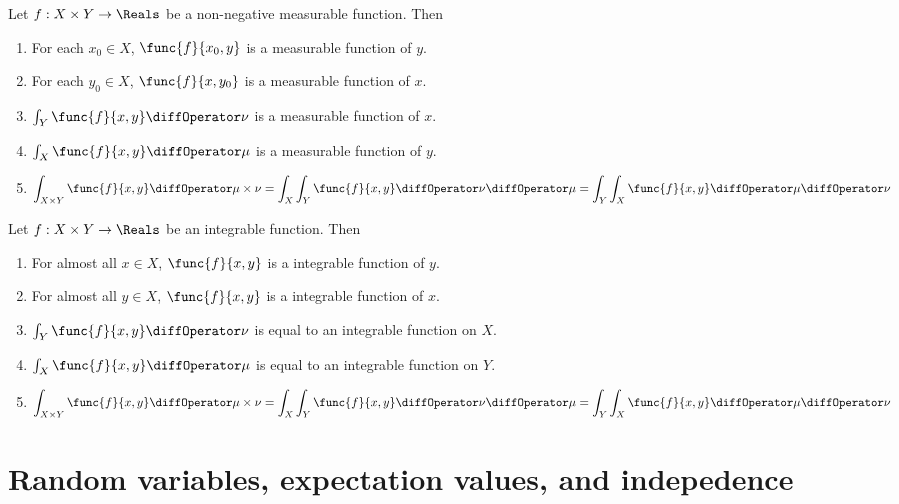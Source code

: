 \begin{theorem}
    Let \(f:X \times Y \to \Reals\) be a non-negative measurable function. Then 
    \begin{enumerate}
        \item For each \(x_0 \in X\), \(\func{f}{x_0,y}\) is a measurable function of \(y\).
        \item For each \(y_0 \in X\), \(\func{f}{x,y_0}\) is a measurable function of \(x\).
        \item \(\int_Y \func{f}{x,y} \diffOperator \nu\) is a measurable function of \(x\).
        \item \(\int_X \func{f}{x,y} \diffOperator \mu\) is a measurable function of \(y\).
        \item 
        \begin{equation*}
            \int_{X \times Y} \func{f}{x,y} \diffOperator \mu \times \nu = \int_X \int_Y \func{f}{x,y} \diffOperator \nu \diffOperator \mu =  \int_Y \int_X \func{f}{x,y} \diffOperator \mu \diffOperator \nu
        \end{equation*}
    \end{enumerate}
\end{theorem}

\begin{theorem}
    Let \(f:X \times Y \to \Reals\) be an integrable function. Then 
    \begin{enumerate}
        \item For almost all \(x \in X\), \(\func{f}{x,y}\) is a integrable function of \(y\).
        \item For almost all \(y \in X\), \(\func{f}{x,y}\) is a integrable function of \(x\).
        \item \(\int_Y \func{f}{x,y} \diffOperator \nu\) is equal \alev to an integrable function on \(X\).
        \item \(\int_X \func{f}{x,y} \diffOperator \mu\) is equal \alev to an integrable function on \(Y\).
        \item 
        \begin{equation*}
            \int_{X \times Y} \func{f}{x,y} \diffOperator \mu \times \nu = \int_X \int_Y \func{f}{x,y} \diffOperator \nu \diffOperator \mu =  \int_Y \int_X \func{f}{x,y} \diffOperator \mu \diffOperator \nu
        \end{equation*}
    \end{enumerate} 
\end{theorem}
\section{Random variables, expectation values, and indepedence}
